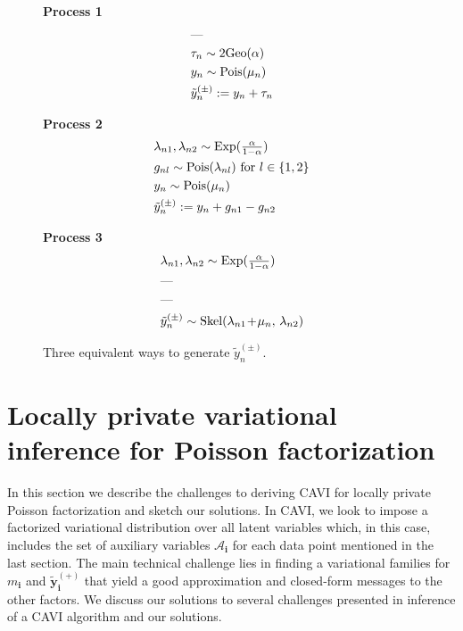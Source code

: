 \documentclass{article}
\newcommand{\subs}{\pmb{i}}
\newcommand{\ms}{m_{\subs}}
\newcommand{\yvtP}{\boldsymbol{\tilde{y}}_{\subs}^{(+)}}
\begin{document}
\begin{figure}[t]
\begin{mdframed}
  \begin{minipage}[l]{0.15\linewidth}
    \textbf{Process 1}
    \begin{align*}
      &\textrm{---}\hfill\\
      &\tau_{n} \sim \textrm{2Geo}(\alpha) \\
      &y_{n} \sim \textrm{Pois}(\mu_{n}) \\
      &\tilde{y}^{(\pm)}_{n} := y_{n} + \tau_{n}
      \end{align*}
    \end{minipage}\hfill
  \begin{minipage}[l]{0.3\linewidth}
    \textbf{Process 2}
    \begin{align*}
      &\lambda_{n1},\lambda_{n2} \sim
      \textrm{Exp}(\mathsmaller{\frac{\alpha}{1-\alpha}})\\
      &g_{nl} \sim \textrm{Pois}(\lambda_{nl}) \textrm{ for } l \in
      \{1,2\} \\
      &y_{n} \sim \textrm{Pois}(\mu_{n}) \\
      &\tilde{y}^{(\pm)}_{n} := y_{n} + g_{n1} - g_{n2}
      \end{align*}
    \end{minipage}\hfill
  \begin{minipage}[l]{0.3\linewidth}
    \textbf{Process 3}
    \begin{align*}
      &\lambda_{n1},\lambda_{n2} \sim
      \textrm{Exp}(\mathsmaller{\frac{\alpha}{1-\alpha}})\\
      &\textrm{---}\hfill\\
      &\textrm{---}\hfill\\
      &\tilde{y}^{(\pm)}_{n} \sim \text{Skel}(\lambda_{n1} \!+\!
      \mu_{n}, \, \lambda_{n2})
      \end{align*}
    \end{minipage}
  \end{mdframed}
  \vspace{-0.5em}
\caption{\label{fig:three_ways}Three equivalent ways to generate $\tilde{y}^{(\pm)}_{n}$.}
\vspace{-0.5em}
\end{figure}



  \section{Locally private variational inference for Poisson factorization}
  In this section we describe the challenges to deriving CAVI for locally
  private Poisson factorization and sketch our solutions. In CAVI, we look to
  impose a factorized variational distribution over all latent variables which,
  in this case, includes the set of auxiliary variables $\mathcal{A}_{\subs}$
  for each data point mentioned in the last section. The main technical
  challenge lies in finding a variational families for $\ms$ and $\yvtP$ that
  yield a good approximation and closed-form messages to the other factors. We
  discuss our solutions to several challenges presented in inference of a CAVI
  algorithm and our solutions.~
   
\end{document}
